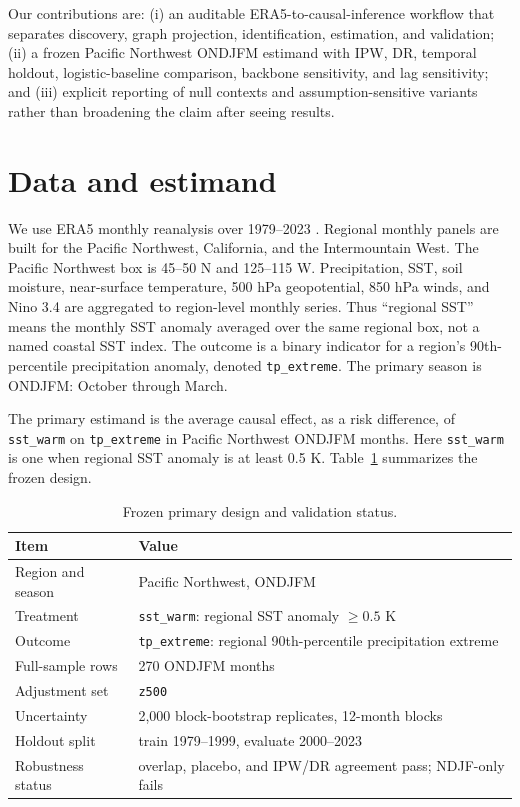 \documentclass{article}
\begin{document}
Our contributions are: (i) an auditable ERA5-to-causal-inference workflow that separates discovery, graph projection, identification, estimation, and validation; (ii) a frozen Pacific Northwest ONDJFM estimand with IPW, DR, temporal holdout, logistic-baseline comparison, backbone sensitivity, and lag sensitivity; and (iii) explicit reporting of null contexts and assumption-sensitive variants rather than broadening the claim after seeing results.

\section{Data and estimand}

We use ERA5 monthly reanalysis over 1979--2023 \citep{hersbach2020era5}. Regional monthly panels are built for the Pacific Northwest, California, and the Intermountain West. The Pacific Northwest box is 45--50 N and 125--115 W. Precipitation, SST, soil moisture, near-surface temperature, 500 hPa geopotential, 850 hPa winds, and Nino 3.4 are aggregated to region-level monthly series. Thus ``regional SST'' means the monthly SST anomaly averaged over the same regional box, not a named coastal SST index. The outcome is a binary indicator for a region's 90th-percentile precipitation anomaly, denoted \texttt{tp\_extreme}. The primary season is ONDJFM: October through March.

The primary estimand is the average causal effect, as a risk difference, of \texttt{sst\_warm} on \texttt{tp\_extreme} in Pacific Northwest ONDJFM months. Here \texttt{sst\_warm} is one when regional SST anomaly is at least 0.5 K. Table~\ref{tab:estimand} summarizes the frozen design.

\begin{table}[t]
\centering
\caption{Frozen primary design and validation status.}
\label{tab:estimand}
\begin{tabular}{ll}
\toprule
Item & Value \\
\midrule
Region and season & Pacific Northwest, ONDJFM \\
Treatment & \texttt{sst\_warm}: regional SST anomaly $\geq 0.5$ K \\
Outcome & \texttt{tp\_extreme}: regional 90th-percentile precipitation extreme \\
Full-sample rows & 270 ONDJFM months \\
Adjustment set & \texttt{z500} \\
Uncertainty & 2,000 block-bootstrap replicates, 12-month blocks \\
Holdout split & train 1979--1999, evaluate 2000--2023 \\
Robustness status & overlap, placebo, and IPW/DR agreement pass; NDJF-only fails \\
\bottomrule
\end{tabular}
\end{table}
\end{document}
